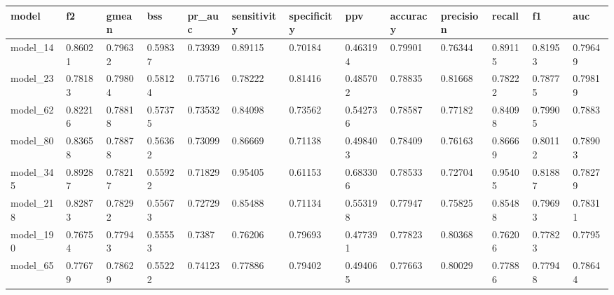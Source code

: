 \begin{tabular}{|l|l|l|l|l|l|l|l|l|l|l|l|l|}
\hline
\textbf{model} & \textbf{f2} & \textbf{gmean} & \textbf{bss} & \textbf{pr\_auc} & \textbf{sensitivity} & \textbf{specificity} & \textbf{ppv} & \textbf{accuracy} & \textbf{precision} & \textbf{recall} & \textbf{f1} & \textbf{auc} \\ \hline
model\_14      & 0.86021     & 0.79632        & 0.59837      & 0.73939          & 0.89115              & 0.70184              & 0.463194     & 0.79901           & 0.76344            & 0.89115         & 0.81953     & 0.79649      \\ \hline
model\_23      & 0.78183     & 0.79804        & 0.58124      & 0.75716          & 0.78222              & 0.81416              & 0.485702     & 0.78835           & 0.81668            & 0.78222         & 0.78775     & 0.79819      \\ \hline
model\_62      & 0.82216     & 0.78818        & 0.57375      & 0.73532          & 0.84098              & 0.73562              & 0.542736     & 0.78587           & 0.77182            & 0.84098         & 0.79905     & 0.7883       \\ \hline
model\_80      & 0.83658     & 0.78878        & 0.56362      & 0.73099          & 0.86669              & 0.71138              & 0.498403     & 0.78409           & 0.76163            & 0.86669         & 0.80112     & 0.78903      \\ \hline
model\_345     & 0.89287     & 0.78217        & 0.55922      & 0.71829          & 0.95405              & 0.61153              & 0.683306     & 0.78533           & 0.72704            & 0.95405         & 0.81887     & 0.78279      \\ \hline
model\_218     & 0.82873     & 0.78292        & 0.55673      & 0.72729          & 0.85488              & 0.71134              & 0.553198     & 0.77947           & 0.75825            & 0.85488         & 0.79693     & 0.78311      \\ \hline
model\_190     & 0.76754     & 0.77943        & 0.55553      & 0.7387           & 0.76206              & 0.79693              & 0.477391     & 0.77823           & 0.80368            & 0.76206         & 0.77823     & 0.7795       \\ \hline
model\_65      & 0.77679     & 0.78629        & 0.55222      & 0.74123          & 0.77886              & 0.79402              & 0.494065     & 0.77663           & 0.80029            & 0.77886         & 0.77948     & 0.78644      \\ \hline

\end{tabular}
